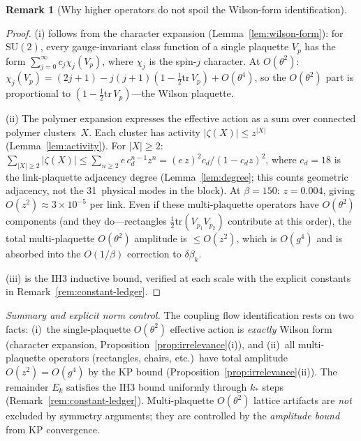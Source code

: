 \documentclass[11pt]{article}
\theoremstyle{definition}
\newtheorem{remark}[theorem]{Remark}
\newcommand{\SU}{\mathrm{SU}}
\newcommand{\tr}{\mathrm{tr}}
\begin{document}
\begin{remark}[Why higher operators do not spoil the Wilson-form identification]
\begin{proof}
(i) follows from the character expansion
(Lemma~\ref{lem:wilson-form}): for $\SU(2)$, every
gauge-invariant class function of a single plaquette
$V_p$ has the form
$\sum_{j=0}^\infty c_j\chi_j(V_p)$, where $\chi_j$ is
the spin-$j$ character.  At $O(\theta^2)$:
$\chi_j(V_p)=(2j+1)-j(j+1)(1-\frac{1}{2}\tr\,V_p)+O(\theta^4)$,
so the $O(\theta^2)$ part is proportional to
$(1-\frac{1}{2}\tr\,V_p)$---the Wilson plaquette.

(ii) The polymer expansion expresses the effective action as a
sum over connected polymer clusters~$X$.  Each cluster has activity
$|\zeta(X)|\le z^{|X|}$ (Lemma~\ref{lem:activity}).  For $|X|\ge 2$:
$\sum_{|X|\ge 2}|\zeta(X)|\le\sum_{n\ge 2}e\,c_d^{n-1}z^n
=(e\,z)^2c_d/(1-c_d z)^2$,
where $c_d=18$ is the link-plaquette adjacency degree
(Lemma~\ref{lem:degree}; this counts geometric adjacency,
not the 31~physical modes in the block).
At $\beta=150$: $z=0.004$, giving $O(z^2)\approx 3\times 10^{-5}$
per link.  Even if these multi-plaquette operators have
$O(\theta^2)$ components (and they do---rectangles
$\frac{1}{2}\tr(V_{p_1}V_{p_2})$ contribute at this order),
the total multi-plaquette $O(\theta^2)$ amplitude is $\le O(z^2)$,
which is $O(g^4)$ and is absorbed into the $O(1/\beta)$
correction to $\delta\beta_k$.

(iii) is the IH3 inductive bound, verified at each scale with
the explicit constants in Remark~\ref{rem:constant-ledger}.
\end{proof}

\emph{Summary and explicit norm control.}
The coupling flow identification rests on two facts:
(i)~the single-plaquette $O(\theta^2)$ effective action is
\emph{exactly} Wilson form (character expansion,
Proposition~\ref{prop:irrelevance}(i)), and
(ii)~all multi-plaquette operators (rectangles, chairs, etc.)\
have total amplitude $O(z^2)=O(g^4)$ by the KP bound
(Proposition~\ref{prop:irrelevance}(ii)).
The remainder $E_k$ satisfies the IH3 bound uniformly
through $k_*$ steps (Remark~\ref{rem:constant-ledger}).
Multi-plaquette $O(\theta^2)$ lattice artifacts are
\emph{not} excluded by symmetry arguments; they are
controlled by the \emph{amplitude bound} from KP convergence.


\end{remark}
\end{document}
